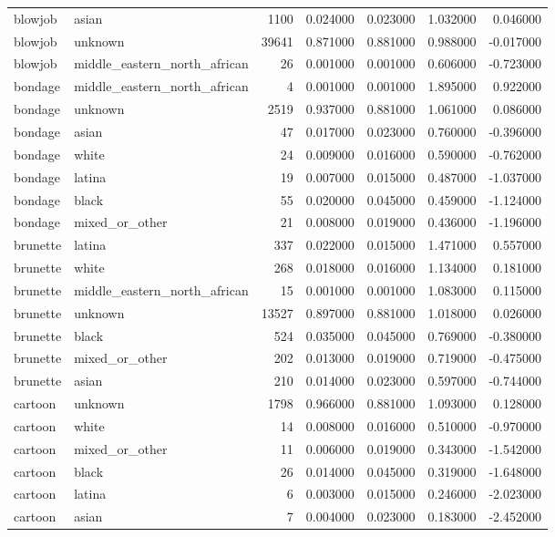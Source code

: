 \begin{tabular}{llrrrrr}
blowjob & asian & 1100 & 0.024000 & 0.023000 & 1.032000 & 0.046000 \\
blowjob & unknown & 39641 & 0.871000 & 0.881000 & 0.988000 & -0.017000 \\
blowjob & middle_eastern_north_african & 26 & 0.001000 & 0.001000 & 0.606000 & -0.723000 \\
bondage & middle_eastern_north_african & 4 & 0.001000 & 0.001000 & 1.895000 & 0.922000 \\
bondage & unknown & 2519 & 0.937000 & 0.881000 & 1.061000 & 0.086000 \\
bondage & asian & 47 & 0.017000 & 0.023000 & 0.760000 & -0.396000 \\
bondage & white & 24 & 0.009000 & 0.016000 & 0.590000 & -0.762000 \\
bondage & latina & 19 & 0.007000 & 0.015000 & 0.487000 & -1.037000 \\
bondage & black & 55 & 0.020000 & 0.045000 & 0.459000 & -1.124000 \\
bondage & mixed_or_other & 21 & 0.008000 & 0.019000 & 0.436000 & -1.196000 \\
brunette & latina & 337 & 0.022000 & 0.015000 & 1.471000 & 0.557000 \\
brunette & white & 268 & 0.018000 & 0.016000 & 1.134000 & 0.181000 \\
brunette & middle_eastern_north_african & 15 & 0.001000 & 0.001000 & 1.083000 & 0.115000 \\
brunette & unknown & 13527 & 0.897000 & 0.881000 & 1.018000 & 0.026000 \\
brunette & black & 524 & 0.035000 & 0.045000 & 0.769000 & -0.380000 \\
brunette & mixed_or_other & 202 & 0.013000 & 0.019000 & 0.719000 & -0.475000 \\
brunette & asian & 210 & 0.014000 & 0.023000 & 0.597000 & -0.744000 \\
cartoon & unknown & 1798 & 0.966000 & 0.881000 & 1.093000 & 0.128000 \\
cartoon & white & 14 & 0.008000 & 0.016000 & 0.510000 & -0.970000 \\
cartoon & mixed_or_other & 11 & 0.006000 & 0.019000 & 0.343000 & -1.542000 \\
cartoon & black & 26 & 0.014000 & 0.045000 & 0.319000 & -1.648000 \\
cartoon & latina & 6 & 0.003000 & 0.015000 & 0.246000 & -2.023000 \\
cartoon & asian & 7 & 0.004000 & 0.023000 & 0.183000 & -2.452000 \\

\end{tabular}
